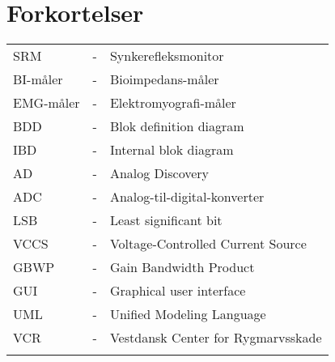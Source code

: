 \chapter{Forkortelser}

\begin{table}[H]
\center
{}
\begin{tabularx}{\linewidth}{l l X}	
SRM         & - &	Synkerefleksmonitor 	\\ \addlinespace[2mm]
BI-måler    & - &   Bioimpedans-måler 		\\ \addlinespace[2mm]
EMG-måler   & - & 	Elektromyografi-måler 	\\ \addlinespace[2mm]
BDD   		& - &   Blok definition diagram	\\ \addlinespace[2mm]
IBD  		& - &   Internal blok diagram	\\ \addlinespace[2mm]
AD  		& - &  	Analog Discovery  		\\ \addlinespace[2mm]
ADC  		& - &  	Analog-til-digital-konverter  \\ \addlinespace[2mm]
LSB  		& - & 	Least significant bit	\\ \addlinespace[2mm]
VCCS 		& - & 	Voltage-Controlled Current Source  \\ \addlinespace[2mm]
GBWP 		& - &  	Gain Bandwidth Product  \\ \addlinespace[2mm]
GUI 		& - &  	Graphical user interface  \\ \addlinespace[2mm]
UML 		& - &  	Unified Modeling Language  \\ \addlinespace[2mm]
VCR         & - &   Vestdansk Center for Rygmarvsskade \\ \addlinespace[2mm]
\end{tabularx}
\end{table}